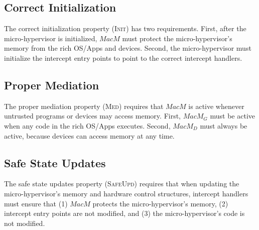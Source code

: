 \subsection{Correct Initialization}
\label{subsec:bg_drive_init}

The correct initialization property (\textsc{Init}) has two requirements. First, after the micro-hypervisor is initialized, $MacM$ must protect the micro-hypervisor's memory from the rich OS/Apps and devices. Second, the micro-hypervisor must initialize the intercept entry points to point to the correct intercept handlers.

\subsection{Proper Mediation}
\label{subsec:bg_drive_med}

The proper mediation property (\textsc{Med}) requires that $MacM$ is active whenever untrusted programs or devices may access memory. First, $MacM_G$ must be active when any code in the rich OS/Apps executes. Second, $MacM_D$ must always be active, because devices can access memory at any time.

\subsection{Safe State Updates}
\label{subsec:bg_drive_safeupd}

The safe state updates property (\textsc{SafeUpd}) requires that when updating the micro-hypervisor's memory and hardware control structures, intercept handlers must ensure that (1) $MacM$ protects the micro-hypervisor's memory, (2) intercept entry points are not modified, and (3) the micro-hypervisor's code is not modified.

